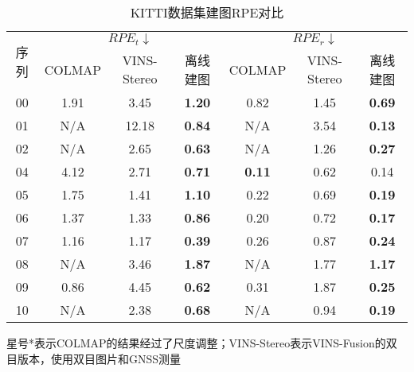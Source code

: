 \begin{table}
\centering
\caption{KITTI数据集建图RPE\textdownarrow{}对比}
\begin{tabular}{c|ccc|ccc}
\toprule
\multirow{2}{*}{序列} & \multicolumn{3}{c|}{$RPE_t \downarrow$}              & \multicolumn{3}{c}{$RPE_r\downarrow$}                    \\ \cline{2-7} 
                    & COLMAP & VINS-Stereo & 离线建图          & COLMAP       & VINS-Stereo & 离线建图  \\
\midrule
00                  & 1.91    & 3.45        & \cellcolor[HTML]{FA7F6F}\textbf{1.20} & 0.82          & 1.45        & \cellcolor[HTML]{FA7F6F}\textbf{0.69} \\
01                  & N/A     & 12.18       & \cellcolor[HTML]{FA7F6F}\textbf{0.84} & N/A           & 3.54        & \cellcolor[HTML]{FA7F6F}\textbf{0.13} \\
02                  & N/A     & 2.65        & \cellcolor[HTML]{FA7F6F}\textbf{0.63} & N/A           & 1.26        & \cellcolor[HTML]{FA7F6F}\textbf{0.27} \\
04                  & 4.12    & 2.71        & \cellcolor[HTML]{FA7F6F}\textbf{0.71} & \cellcolor[HTML]{FA7F6F}\textbf{0.11} & 0.62        & 0.14          \\
05                  & 1.75    & 1.41        & \cellcolor[HTML]{FA7F6F}\textbf{1.10} & 0.22          & 0.69        & \cellcolor[HTML]{FA7F6F}\textbf{0.19} \\
06                  & 1.37    & 1.33        & \cellcolor[HTML]{FA7F6F}\textbf{0.86} & 0.20          & 0.72        & \cellcolor[HTML]{FA7F6F}\textbf{0.17} \\
07                  & 1.16    & 1.17        & \cellcolor[HTML]{FA7F6F}\textbf{0.39} & 0.26          & 0.87        & \cellcolor[HTML]{FA7F6F}\textbf{0.24} \\
08                  & N/A     & 3.46        & \cellcolor[HTML]{FA7F6F}\textbf{1.87} & N/A           & 1.77        & \cellcolor[HTML]{FA7F6F}\textbf{1.17} \\
09                  & 0.86    & 4.45        & \cellcolor[HTML]{FA7F6F}\textbf{0.62} & 0.31          & 1.87        & \cellcolor[HTML]{FA7F6F}\textbf{0.25} \\
10                  & N/A     & 2.38        & \cellcolor[HTML]{FA7F6F}\textbf{0.68} & N/A           & 0.94        & \cellcolor[HTML]{FA7F6F}\textbf{0.19} \\ \bottomrule
\end{tabular}
\label{tab:map_rpe}
\begin{tablenotes}
  \footnotesize
  \item 星号*表示COLMAP的结果经过了尺度调整；VINS-Stereo表示VINS-Fusion的双目版本，使用双目图片和GNSS测量
\end{tablenotes}
\end{table}


